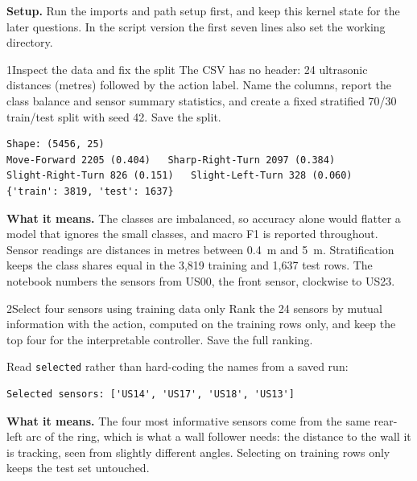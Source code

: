 \textbf{Setup.} Run the imports and path setup first, and keep this kernel state for the later questions. In the script version the first seven lines also set the working directory.



\begin{labquestion}{1}{Inspect the data and fix the split}
The CSV has no header: 24 ultrasonic distances (metres) followed by the action label. Name the columns, report the class balance and sensor summary statistics, and create a fixed stratified 70/30 train/test split with seed 42. Save the split.
\end{labquestion}
\begin{labanswer}


\begin{refoutput}
\begin{lstlisting}[style=utpterminal]
Shape: (5456, 25)
Move-Forward 2205 (0.404)   Sharp-Right-Turn 2097 (0.384)
Slight-Right-Turn 826 (0.151)   Slight-Left-Turn 328 (0.060)
{'train': 3819, 'test': 1637}
\end{lstlisting}
\end{refoutput}

\textbf{What it means.} The classes are imbalanced, so accuracy alone would flatter a model that ignores the small classes, and macro F1 is reported throughout. Sensor readings are distances in metres between 0.4~m and 5~m. Stratification keeps the class shares equal in the 3,819 training and 1,637 test rows. The notebook numbers the sensors from US00, the front sensor, clockwise to US23.
\end{labanswer}

\begin{labquestion}{2}{Select four sensors using training data only}
Rank the 24 sensors by mutual information with the action, computed on the training rows only, and keep the top four for the interpretable controller. Save the full ranking.
\end{labquestion}
\begin{labanswer}
Read \texttt{selected} rather than hard-coding the names from a saved run:



\begin{refoutput}
\begin{lstlisting}[style=utpterminal]
Selected sensors: ['US14', 'US17', 'US18', 'US13']
\end{lstlisting}
\end{refoutput}

\textbf{What it means.} The four most informative sensors come from the same rear-left arc of the ring, which is what a wall follower needs: the distance to the wall it is tracking, seen from slightly different angles. Selecting on training rows only keeps the test set untouched.
\end{labanswer}

